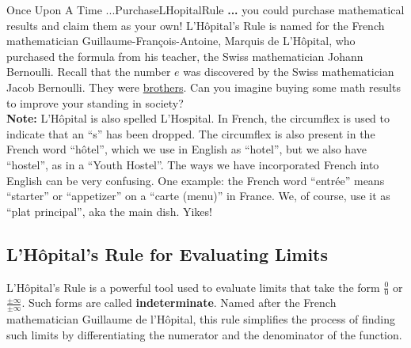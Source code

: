 \begin{funColor}{Once Upon A Time ...}{PurchaseLHopitalRule}
   {\bf ...} you could purchase mathematical results and claim them as your own! L'H\^opital's Rule is named for the French mathematician Guillaume-François-Antoine, Marquis de L'H\^opital, who purchased the formula from his teacher, the Swiss mathematician Johann Bernoulli. Recall that the number $e$ was discovered by the Swiss mathematician Jacob Bernoulli. They were \href{https://en.wikipedia.org/wiki/Bernoulli_family#:~:text=In%20addition%20to%20Jacob%20and,%E2%80%931726)%2C%20son%20of%20Johann}{brothers}. Can you imagine buying some math results to improve your standing in society? \\

   \textbf{Note:} L'H\^opital is also spelled L'Hospital. In French, the circumflex is used to indicate that an ``s'' has been dropped. The circumflex is also present in the French word ``h\^otel'', which we use in English as ``hotel'', but we also have ``hostel'', as in a ``Youth Hostel''. The ways we have incorporated French into English can be very confusing. One example: the French word ``entr\'ee'' means ``starter'' or ``appetizer'' on a ``carte (menu)'' in France. We, of course, use it as ``plat principal'', aka the main dish. Yikes!
\end{funColor}


\subsection{L'H\^opital's Rule for Evaluating Limits}

L'H\^opital's Rule is a powerful tool used to evaluate limits that take the form $\frac{0}{0}$ or $\frac{\pm \infty}{\pm \infty}$. Such forms are called \textbf{indeterminate}. Named after the French mathematician Guillaume de l'H\^opital, this rule simplifies the process of finding such limits by differentiating the numerator and the denominator of the function.


